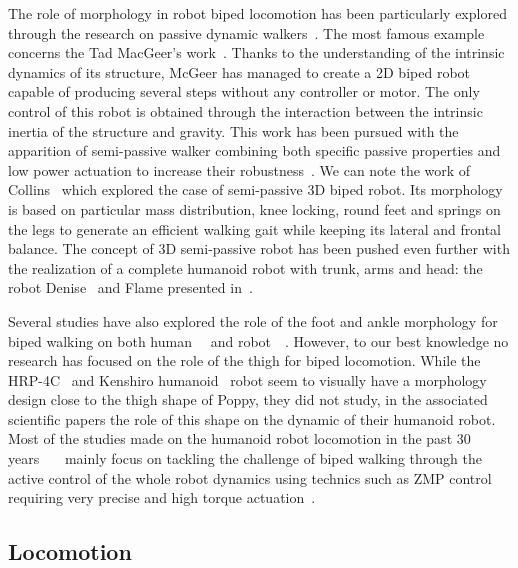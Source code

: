 The role of morphology in robot biped locomotion has been particularly explored through the research on passive dynamic walkers~\cite{wisse2007passive}. The most famous example concerns the Tad MacGeer's work~\cite{mcgeer1990passive}. Thanks to the understanding of the intrinsic dynamics of its structure, McGeer has managed to create a 2D biped robot capable of producing several steps without any controller or motor.
The only control of this robot is obtained through the interaction between the intrinsic inertia of the structure and gravity.
This work has been pursued with the apparition of semi-passive walker combining both specific passive properties and low power actuation to increase their robustness~\cite{Anderson2005}. We can note the work of Collins~\cite{collins2005bipedal} which explored the case of semi-passive 3D biped robot. Its morphology is based on particular mass distribution, knee locking, round feet and springs on the legs to generate an efficient walking gait while keeping its lateral and frontal balance.
The concept of 3D semi-passive robot has been pushed even further with the realization of a complete humanoid robot with trunk, arms and head: the robot Denise~\cite{wisse2005three} and Flame presented in~\cite{Hobbelen2008}.

Several studies have also explored the role of the foot and ankle morphology for biped walking on both human~\cite{Adamczyk2006}~\cite{Hughes1990} and robot~\cite{hobbelen2005ankle}~\cite{Davis2010}. However, to our best knowledge no research has focused on the role of the thigh for biped locomotion. While the HRP-4C~\cite{kaneko2009cybernetic} and Kenshiro humanoid~\cite{nakanishi2013design} robot seem to visually have a morphology design close to the thigh shape of Poppy, they did not study, in the associated scientific papers the role of this shape on the dynamic of their humanoid robot.
Most of the studies made on the humanoid robot locomotion in the past 30 years~\cite{park1998biped}~\cite{aoi2005locomotion}~\cite{park1998biped} mainly focus on tackling the challenge of biped walking through the active control of the whole robot dynamics using technics such as ZMP control~\cite{vukobratovic2004zero} requiring very precise and high torque actuation~\cite{akachi2005development}.




\subsection{Locomotion} %

